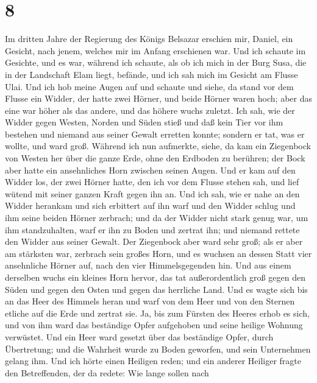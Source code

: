 \hypertarget{section-7}{%
\section{8}\label{section-7}}

 Im dritten Jahre der Regierung des Königs Belsazar
erschien mir, Daniel, ein Gesicht, nach jenem, welches mir im Anfang
erschienen war.  Und ich schaute im Gesichte, und es war,
während ich schaute, als ob ich mich in der Burg Susa, die in der
Landschaft Elam liegt, befände, und ich sah mich im Gesicht am Flusse
Ulai.  Und ich hob meine Augen auf und schaute und siehe,
da stand vor dem Flusse ein Widder, der hatte zwei Hörner, und beide
Hörner waren hoch; aber das eine war höher als das andere, und das
höhere wuchs zuletzt.  Ich sah, wie der Widder gegen
Westen, Norden und Süden stieß und daß kein Tier vor ihm bestehen und
niemand aus seiner Gewalt erretten konnte; sondern er tat, was er
wollte, und ward groß.  Während ich nun aufmerkte, siehe,
da kam ein Ziegenbock von Westen her über die ganze Erde, ohne den
Erdboden zu berühren; der Bock aber hatte ein ansehnliches Horn zwischen
seinen Augen.  Und er kam auf den Widder los, der zwei
Hörner hatte, den ich vor dem Flusse stehen sah, und lief wütend mit
seiner ganzen Kraft gegen ihn an.  Und ich sah, wie er
nahe an den Widder herankam und sich erbittert auf ihn warf und den
Widder schlug und ihm seine beiden Hörner zerbrach; und da der Widder
nicht stark genug war, um ihm standzuhalten, warf er ihn zu Boden und
zertrat ihn; und niemand rettete den Widder aus seiner Gewalt.
 Der Ziegenbock aber ward sehr groß; als er aber am
stärksten war, zerbrach sein großes Horn, und es wuchsen an dessen Statt
vier ansehnliche Hörner auf, nach den vier Himmelsgegenden hin.
 Und aus einem derselben wuchs ein kleines Horn hervor,
das tat außerordentlich groß gegen den Süden und gegen den Osten und
gegen das herrliche Land.  Und es wagte sich bis an das
Heer des Himmels heran und warf von dem Heer und von den Sternen etliche
auf die Erde und zertrat sie.  Ja, bis zum Fürsten des
Heeres erhob es sich, und von ihm ward das beständige Opfer aufgehoben
und seine heilige Wohnung verwüstet.  Und ein Heer ward
gesetzt über das beständige Opfer, durch Übertretung; und die Wahrheit
wurde zu Boden geworfen, und sein Unternehmen gelang ihm.
 Und ich hörte einen Heiligen reden; und ein anderer
Heiliger fragte den Betreffenden, der da redete: Wie lange sollen nach
